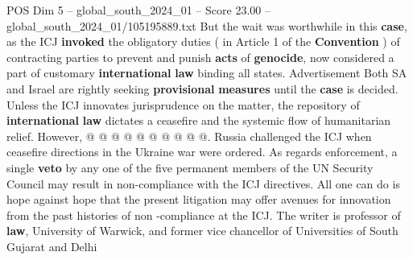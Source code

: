 \begin{textsample}{POS Dim 5 – global\_south\_2024\_01 – Score 23.00 – global\_south\_2024\_01/105195889.txt}
But the wait was worthwhile in this \textbf{case}, as the ICJ \textbf{invoked} the obligatory duties ( in Article 1 of the \textbf{Convention} ) of contracting parties to prevent and punish \textbf{acts} of \textbf{genocide}, now considered a part of customary \textbf{international} \textbf{law} binding all states.
Advertisement Both SA and Israel are rightly seeking \textbf{provisional} \textbf{measures} until the \textbf{case} is decided.
Unless the ICJ innovates jurisprudence on the matter, the repository of \textbf{international} \textbf{law} dictates a ceasefire and the systemic flow of humanitarian relief.
However, @ @ @ @ @ @ @ @ @ @.
Russia challenged the ICJ when ceasefire directions in the Ukraine war were ordered.
As regards enforcement, a single \textbf{veto} by any one of the five permanent members of the UN Security Council may result in non-compliance with the ICJ directives.
All one can do is hope against hope that the present litigation may offer avenues for innovation from the past histories of non -compliance at the ICJ.
The writer is professor of \textbf{law}, University of Warwick, and former vice chancellor of Universities of South Gujarat and Delhi

\end{textsample}
